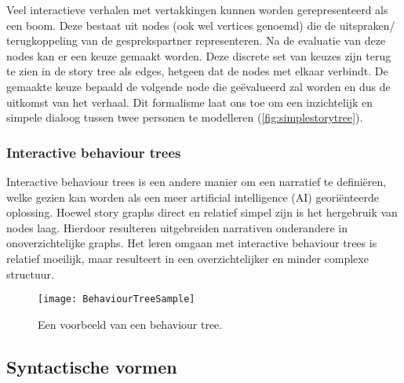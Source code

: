 Veel interactieve verhalen met vertakkingen kunnen worden gerepresenteerd als een boom\cite{GalyeanIII1995}. Deze bestaat uit nodes (ook wel vertices genoemd) die de uitspraken/ terugkoppeling van de gesprekspartner representeren. Na de evaluatie van deze nodes kan er een keuze gemaakt worden. Deze discrete set van keuzes zijn terug te zien in de story tree als edges, hetgeen dat de nodes met elkaar verbindt. De gemaakte keuze bepaald de volgende node die geëvalueerd zal worden en dus de uitkomst van het verhaal. Dit formalisme laat ons toe om een inzichtelijk en simpele dialoog tussen twee personen te modelleren (\autoref{fig:simplestorytree}).

\subsubsection{Interactive behaviour trees}


Interactive behaviour trees is een andere manier om een narratief te definiëren, welke gezien kan worden als een meer artificial intelligence (AI) georiënteerde oplossing. Hoewel story graphs direct en relatief simpel zijn is het hergebruik van nodes laag. Hierdoor resulteren uitgebreiden narrativen onderandere in onoverzichtelijke graphs. Het leren omgaan met interactive behaviour trees is relatief moeilijk, maar resulteert in een overzichtelijker en minder complexe structuur\cite{Kapadia2015}. 

\begin{figure}[htb]
    \centering
    \texttt{[image: BehaviourTreeSample]}
    \caption[]{Een voorbeeld van een behaviour tree. \footnotemark}
    \label{fig:behaviourtreesample}
\end{figure}

\pagebreak
\subsection{Syntactische vormen}

